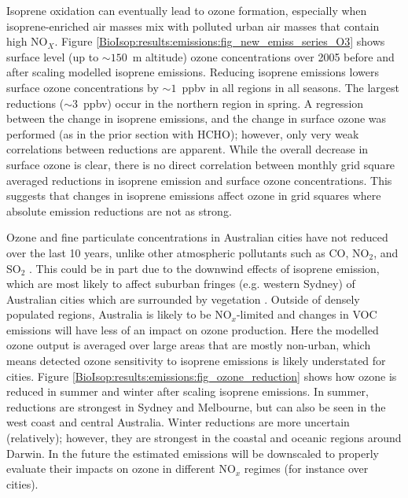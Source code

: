       Isoprene oxidation can eventually lead to ozone formation, especially when isoprene-enriched air masses mix with polluted urban air masses that contain high NO$_X$.
      Figure \ref{BioIsop:results:emissions:fig_new_emiss_series_O3} shows surface level (up to $\sim{150}$~m altitude) ozone concentrations over 2005 before and after scaling modelled isoprene emissions.
      Reducing isoprene emissions lowers surface ozone concentrations by $\sim1$~ppbv in all regions in all seasons.
      The largest reductions ($\sim3$~ppbv) occur in the northern region in spring.
      A regression between the change in isoprene emissions, and the change in surface ozone was performed (as in the prior section with HCHO); however, only very weak correlations between reductions are apparent.
      While the overall decrease in surface ozone is clear, there is no direct correlation between monthly grid square averaged reductions in isoprene emission and surface ozone concentrations.
      This suggests that changes in isoprene emissions affect ozone in grid squares where absolute emission reductions are not as strong.
      
      
      
      Ozone and fine particulate concentrations in Australian cities have not reduced over the last 10 years, unlike other atmospheric pollutants such as CO, NO$_2$, and SO$_2$ \parencite{SOE2016}.
      This could be in part due to the downwind effects of isoprene emission, which are most likely to affect suburban fringes (e.g. western Sydney) of Australian cities which are surrounded by vegetation \parencite{Millet2016}.
      Outside of densely populated regions, Australia is likely to be NO$_x$-limited and changes in VOC emissions will have less of an impact on ozone production.
      Here the modelled ozone output is averaged over large areas that are mostly non-urban, which means detected ozone sensitivity to isoprene emissions is likely understated for cities.
      Figure \ref{BioIsop:results:emissions:fig_ozone_reduction} shows how ozone is reduced in summer and winter after scaling isoprene emissions.
      In summer, reductions are strongest in Sydney and Melbourne, but can also be seen in the west coast and central Australia.
      Winter reductions are more uncertain (relatively); however, they are strongest in the coastal and oceanic regions around Darwin.
      In the future the estimated emissions will be downscaled to properly evaluate their impacts on ozone in different NO$_x$ regimes (for instance over cities).
      
